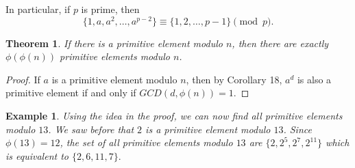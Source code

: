 \documentclass[12pt]{article}
\theoremstyle{plain}
\newtheorem{example}{Example}
\newtheorem{theorem}{Theorem}
\theoremstyle{definition}
\theoremstyle{remark}
\begin{document}
In particular, if $p$ is prime, then 
$$\{1, a, a^2, \dots, a^{p-2}\} \equiv \{1,2, \dots, p-1\} \pmod{p}.$$

\bigskip
\noindent
\begin{theorem}
If there is a primitive element modulo $n$, then there are exactly $\phi(\phi(n))$ primitive elements modulo $n$.
\end{theorem}
\begin{proof}
If $a$ is a primitive element modulo $n$, then by Corollary 18, $a^d$ is also a primitive element if and only if $GCD(d, \phi(n))=1$.
\end{proof}
\begin{example}
Using the idea in the proof, we can now find all primitive elements modulo $13$. We saw before that $2$ is a primitive element modulo $13$. Since $\phi(13)=12$, the set of all primitive elements modulo $13$ are $\{2, 2^5, 2^7, 2^{11}\}$ which is equivalent to $\{2, 6, 11, 7\}. $
\end{example}
\end{document}
